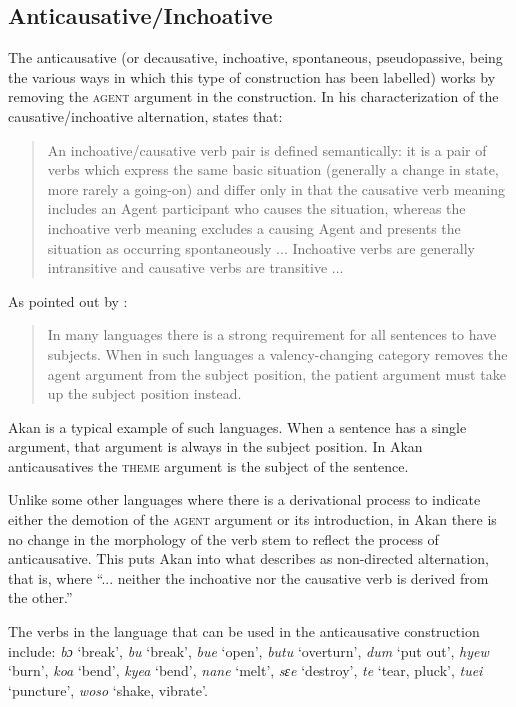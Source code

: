 \documentclass[output=paper]{langsci/langscibook}
\begin{document}
\subsection{Anticausative/Inchoative}\label{§4.3:anticausative.osam}

The anticausative (or decausative, inchoative, spontaneous, pseudopassive, being the various ways in which this type of construction has been labelled) works by removing the \textsc{agent} argument in the construction. In his characterization of the causative/inchoative alternation, \citeauthor{haspelmath1993} states that:

\begin{quote}
An inchoative/causative verb pair is defined semantically: it is a pair of verbs which express the same basic situation (generally a change in state, more rarely a going-on) and differ only in that the causative verb meaning includes an Agent participant who causes the situation, whereas the inchoative verb meaning excludes a causing Agent and presents the situation as occurring spontaneously ... Inchoative verbs are generally intransitive and causative verbs are transitive ... \citep[90]{haspelmath1993}
\end{quote}

As pointed out by \citet[1132]{haspelmathmuellerbardey2004}: 

\begin{quote}
In many languages there is a strong requirement for all sentences to have subjects. When in such languages a valency-changing category removes the agent argument from the subject position, the patient argument must take up the subject position instead.
\end{quote}

Akan is a typical example of such languages. When a sentence has a single argument, that argument is always in the subject position. In Akan anticausatives the \textsc{theme} argument is the subject of the sentence. 

Unlike some other languages where there is a derivational process to indicate either the demotion of the \textsc{agent} argument or its introduction, in Akan there is no change in the morphology of the verb stem to reflect the process of anticausative. This puts Akan into what \citet[91]{haspelmath1993} describes as non-directed alternation, that is, where ``... neither the inchoative nor the causative verb is derived from the other.''

The verbs in the language that can be used in the anticausative construction include: \textit{bɔ} `break', \textit{bu} `break', \textit{bue} `open', \textit{butu} `overturn', \textit{dum} `put out', \textit{hyew} `burn', \textit{koa} `bend', \textit{kyea} `bend', \textit{nane} `melt', \textit{sɛe} `destroy', \textit{te} `tear, pluck', \textit{tuei} `puncture', \textit{woso} `shake, vibrate'. 
\end{document}
